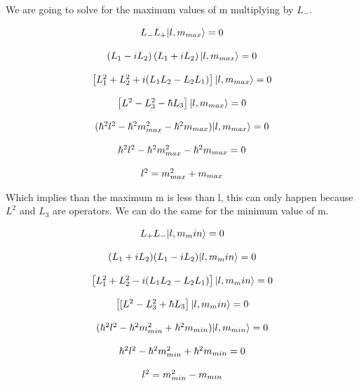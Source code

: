 We are going to solve for the maximum values of m multiplying by $L_-$.

\begin{equation}
  \begin{array}{c}
    L_- L_+ \lvert l,m_{max}\rangle = 0
    \\

    \\
    \left(L_1-iL_2\right)\left(L_1+iL_2\right)\lvert l,m_{max}\rangle = 0
    \\

    \\
    \left[L_1^2+L_2^2 + i(L_1L_2-L_2L_1)\right]\lvert l,m_{max}\rangle = 0
    \\

    \\
    \left[L^2 - L_3^2 - \hbar L_3\right]\lvert l,m_{max}\rangle = 0
    \\

    \\
    (\hbar^2 l^2 - \hbar^2 m_{max}^2 - \hbar^2 m_{max})\lvert l,m_{max}\rangle = 0
    \\

    \\
    \hbar^2 l^2 - \hbar^2 m_{max}^2 - \hbar^2 m_{max} = 0
    \\

    \\
    l^2 = m_{max}^2 + m_{max}
  \end{array}
\end{equation}

Which implies than the maximum m is less than l, this can only happen because $L^2$ and $L_3$ are operators. We can do the same for the minimum value of m.

\begin{equation}
  \begin{array}{c}
    L_+ L_- \lvert l,m_min\rangle = 0
    \\

    \\
    (L_1+iL_2)(L_1-iL_2)\lvert l,m_min\rangle = 0
    \\

    \\
    \left[L_1^2+L_2^2 - i(L_1L_2-L_2L_1)\right]\lvert l,m_min\rangle = 0
    \\

    \\
    \left[[L^2 - L_3^2 + \hbar L_3\right]\lvert l,m_min\rangle = 0
    \\

    \\
    (\hbar^2 l^2 - \hbar^2 m_{min}^2 + \hbar^2 m_{min})\lvert l,m_{min}\rangle = 0
    \\

    \\
    \hbar^2 l^2 - \hbar^2 m_{min}^2 + \hbar^2 m_{min} = 0
    \\

    \\
    l^2 = m_{min}^2 - m_{min}
  \end{array}
\end{equation}

